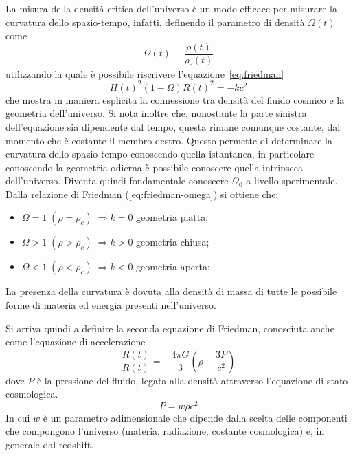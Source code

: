 La misura della densità critica dell'universo è un modo efficace per misurare la curvatura dello spazio-tempo, infatti, definendo il parametro di densità $\Omega(t)$ come
\begin{equation}\label{eq:parametro-densità}
    \Omega (t) \equiv  \frac{\rho (t)}{\rho_c (t)}
\end{equation}
utilizzando la quale è possibile riscrivere l'equazione~\ref{eq:friedman}
\begin{equation}\label{eq:friedman-omega}
    H(t)^2 (1-\Omega)R(t)^2 = -kc^2
\end{equation}
che mostra in maniera esplicita la connessione tra densità del fluido cosmico e la geometria dell'universo. Si nota inoltre che, nonostante la parte sinistra dell'equazione sia dipendente dal tempo, questa rimane comunque costante, dal momento che è costante il membro destro. Questo permette di determinare la curvatura dello spazio-tempo conoscendo quella istantanea, in particolare conoscendo la geometria odierna è possibile conoscere quella intrinseca dell'universo. Diventa quindi fondamentale conoscere $\Omega_0$ a livello sperimentale.
Dalla relazione di Friedman (\ref{eq:friedman-omega}) si ottiene che:
\begin{itemize}
    \item $\Omega = 1 \; (\rho = \rho_c)\; \Rightarrow k = 0$ geometria piatta;
    \item $\Omega > 1 \; (\rho > \rho_c)\; \Rightarrow k > 0$ geometria chiusa;
    \item $\Omega < 1 \; (\rho < \rho_c)\; \Rightarrow k < 0$ geometria aperta;
\end{itemize}
La presenza della curvatura è dovuta alla densità di massa di tutte le possibile forme di materia ed energia presenti nell'universo.

Si arriva quindi a definire la seconda equazione di Friedman, conosciuta anche come l'equazione di accelerazione
\begin{equation}\label{eq:second-friedman}
    \frac{\ddot{R}(t)}{R(t)} = - \frac{4\pi G}{3} \left( {\rho + \frac{3P}{c^2}} \right)
\end{equation}
dove $P$ è la pressione del fluido, legata alla densità attraverso l'equazione di stato cosmologica.
\begin{equation}\label{eq:equazione-stato}
    P = w \rho c^2
\end{equation}
In cui $w$ è un parametro adimensionale che dipende dalla scelta delle componenti che compongono l'universo (materia, radiazione, costante cosmologica) e, in generale dal redshift.
